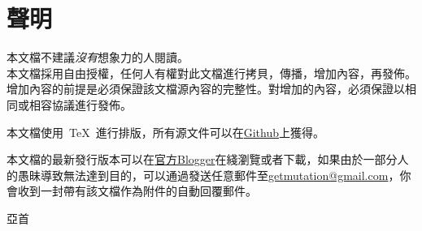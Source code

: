 \chapter{聲明}

{\noindent\Large 本文檔不建議\emph{沒有}想象力的人閱讀。}
\\

本文檔採用自由授權，任何人有權對此文檔進行拷貝，傳播，增加內容，再發佈。增加內容的前提是必須保證該文檔源內容的完整性。對增加的內容，必須保證以相同或相容協議進行發佈。

本文檔使用~\TeX~進行排版，所有源文件可以在\href{http://www.github.com}{Github}上獲得。

本文檔的最新發行版本可以在\href{http://mutantion.blogspot.com}{官方Blogger}在綫瀏覽或者下載，如果由於一部分人的愚昧導致無法達到目的，可以通過發送任意郵件至\href{mailto:getmutation@gmail.com}{getmutation@gmail.com}，你會收到一封帶有該文檔作為附件的自動回覆郵件。

\begin{flushright}
亞首
\end{flushright}

